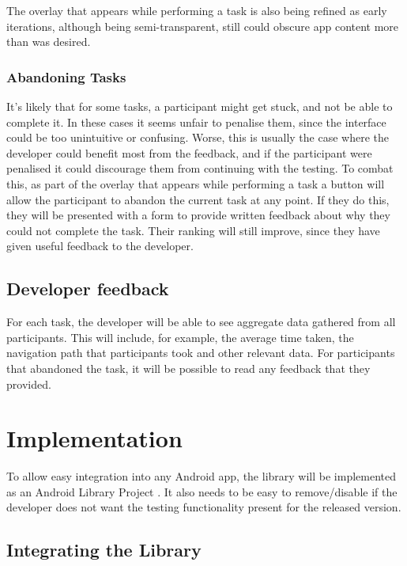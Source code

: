 The overlay that appears while performing a task is also being refined as early iterations, although being semi-transparent, still could obscure app content more than was desired.

\subsection{Abandoning Tasks}

It's likely that for some tasks, a participant might get stuck, and not be able to complete it. In these cases it seems unfair to penalise them, since the interface could be too unintuitive or confusing. Worse, this is usually the case where the developer could benefit most from the feedback, and if the participant were penalised it could discourage them from continuing with the testing. To combat this, as part of the overlay that appears while performing a task a button will allow the participant to abandon the current task at any point. If they do this, they will be presented with a form to provide written feedback about why they could not complete the task. Their ranking will still improve, since they have given useful feedback to the developer.

\section{Developer feedback}

For each task, the developer will be able to see aggregate data gathered from all participants. This will include, for example, the average time taken, the navigation path that participants took and other relevant data. For participants that abandoned the task, it will be possible to read any feedback that they provided.

\chapter{Implementation}

To allow easy integration into any Android app, the library will be implemented as an Android Library Project \cite{android-library}. It also needs to be easy to remove/disable if the developer does not want the testing functionality present for the released version.

\section{Integrating the Library}

